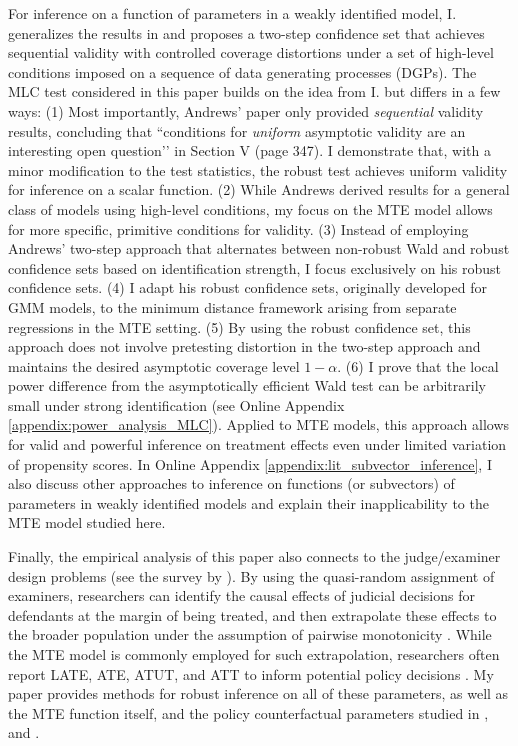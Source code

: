 \documentclass[11pt]{article}
\theoremstyle{definition}
\newcommand{\0}{\ensuremath{\mathbf{0}}}
\begin{document}
\begin{bibunit}
For inference on a function of parameters in a weakly identified model, I. \cite{andrews.i:2018} generalizes the results in \cite{chaudhuri/zivot:2011} and proposes a two-step confidence set that achieves sequential validity with controlled coverage distortions under a set of high-level conditions imposed on a sequence of data generating processes (DGPs). The MLC test considered in this paper builds on the idea from I. \cite{andrews.i:2018} but differs in a few ways: (1) Most importantly, Andrews’ paper only provided \textit{sequential} validity results, concluding that ``conditions for \textit{uniform} asymptotic validity are an interesting open question’’ in Section V (page 347). I demonstrate that, with a minor modification to the test statistics, the robust test achieves uniform validity for inference on a scalar function. (2) While Andrews derived results for a general class of models using high-level conditions, my focus on the MTE model allows for more specific, primitive conditions for validity. (3) Instead of employing Andrews' two-step approach that alternates between non-robust Wald and robust confidence sets based on identification strength, I focus exclusively on his robust confidence sets. (4) I adapt his robust confidence sets, originally developed for GMM models, to the minimum distance framework arising from separate regressions in the MTE setting.  (5) By using the robust confidence set, this approach does not involve pretesting distortion in the two-step approach and maintains the desired asymptotic coverage level $1-\alpha$. (6) I prove that the local power difference from the asymptotically efficient Wald test can be arbitrarily small under strong identification (see Online Appendix \ref{appendix:power_analysis_MLC}). Applied to MTE models, this approach allows for valid and powerful inference on treatment effects even under limited variation of propensity scores. In Online Appendix \ref{appendix:lit_subvector_inference}, I also discuss other approaches to inference on functions (or subvectors) of parameters in weakly identified models and explain their inapplicability to the MTE model studied here.

Finally, the empirical analysis of this paper also connects to the judge/examiner design problems (see the survey by \cite{chyn/frandsen/leslie:2024}). By using the quasi-random assignment of examiners, researchers can identify the causal effects of judicial decisions for defendants at the margin of being treated, and then extrapolate these effects to the broader population under the assumption of pairwise monotonicity \citep{frandsen/lefgren/leslie:2023}. While the MTE model is commonly employed for such extrapolation, researchers often report LATE, ATE, ATUT, and ATT to inform potential policy decisions \citep{bhuller/dahl/loken/mogstad:2020, agan/doleac/harvey:2023, baron/gross:2023}. My paper provides methods for robust inference on all of these parameters, as well as the MTE function itself, and the policy counterfactual parameters studied in \cite{heckman/vytlacil:2001, heckman/vytlacil:2005}, and \cite{carneiro/heckman/vytlacil:2010}.




\end{bibunit}
\end{document}
